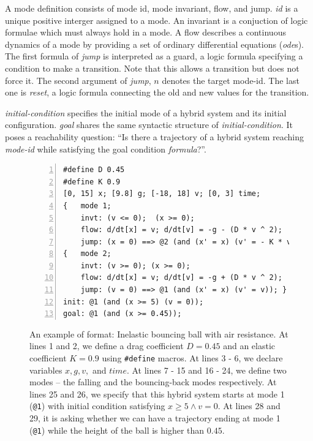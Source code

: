 A mode definition consists of mode id, mode invariant, flow, and jump.
\textit{id} is a unique positive interger assigned to a mode. An
invariant is a conjuction of logic formulae which must always hold in
a mode. A flow describes a continuous dynamics of a mode by providing
a set of ordinary differential equations (\textit{ode}s). The first
formula of \textit{jump} is interpreted as a guard, a logic formula
specifying a condition to make a transition. Note that this allows a
transition but does not force it. The second argument of
\textit{jump}, $n$ denotes the target mode-id. The last one is
\textit{reset}, a logic formula connecting the old and new values for
the transition.

\textit{initial-condition} specifies the initial mode of a hybrid
system and its initial configuration. \textit{goal} shares the same
syntactic structure of \textit{initial-condition}. It poses a
reachability question: ``Is there a trajectory of a hybrid system
reaching \textit{mode-id} while satisfying the goal condition
\textit{formula}?''.

\begin{figure}
  \centering
  \begin{Verbatim}[fontfamily=courier, frame=single, framesep=1mm,
  numbers=left, fontsize=\scriptsize]
#define D 0.45
#define K 0.9
[0, 15] x; [9.8] g; [-18, 18] v; [0, 3] time;
{   mode 1;
    invt: (v <= 0);  (x >= 0);
    flow: d/dt[x] = v; d/dt[v] = -g - (D * v ^ 2);
    jump: (x = 0) ==> @2 (and (x' = x) (v' = - K * v)); }
{   mode 2;
    invt: (v >= 0); (x >= 0);
    flow: d/dt[x] = v; d/dt[v] = -g + (D * v ^ 2);
    jump: (v = 0) ==> @1 (and (x' = x) (v' = v)); }
init: @1 (and (x >= 5) (v = 0));
goal: @1 (and (x >= 0.45));
\end{Verbatim}
\caption{An example of \drh{} format: Inelastic bouncing ball with air
  resistance. At lines 1 and 2, we define a drag coefficient $D = 0.45$
  and an elastic coefficient $K = 0.9$ using \texttt{\#define} macros.
  At lines 3 - 6, we declare variables $x, g, v,$ and $time$. At lines
  7 - 15 and 16 - 24, we define two modes -- the falling and the
  bouncing-back modes respectively. At lines 25 and 26, we specify
  that this hybrid system starts at mode 1 (\texttt{@1}) with initial
  condition satisfying $x \ge 5 \land v = 0$. At lines 28 and 29, it
  is asking whether we can have a trajectory ending at mode 1
  (\texttt{@1}) while the height of the ball is higher than $0.45$.}
\label{fig:bouncing-ball-drh}
\end{figure}


